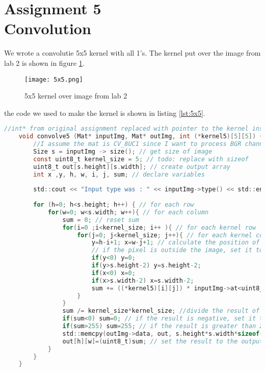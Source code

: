 \section {Assignment 5 \\ {Convolution}}
\label {sec:assignment_5}

We wrote a convolutie 5x5 kernel with all 1's. The kernel put over the image from lab 2 is shown in figure \ref{fig:5x5}.

\begin{figure}[h!]
    \centering
    \texttt{[image: 5x5.png]}
    \caption{5x5 kernel over image from lab 2}
    \label{fig:5x5}
\end{figure}

the code we used to make the kernel is shown in listing \ref{lst:5x5}.

\begin{lstlisting}[language=C, caption=5x5 kernel, label=lst:5x5]
    //int* from original assignment replaced with pointer to the kernel instead, because that makes more sense
    void convolve5 (Mat* inputImg, Mat* outImg, int (*kernel5)[5][5]) { 
        //I assume the mat is CV_8UC1 since I want to process BGR channels individually
        Size s = inputImg -> size(); // get size of image
        const uint8_t kernel_size = 5; // todo: replace with sizeof
        uint8_t out[s.height][s.width]; // create output array
        int x ,y, h, w, i, j, sum; // declare variables
        
        std::cout << "Input type was : " << inputImg->type() << std::endl; //debug
      
        for (h=0; h<s.height; h++) { // for each row
            for(w=0; w<s.width; w++){ // for each column
                sum = 0; // reset sum
                for(i=0 ;i<kernel_size; i++ ){ // for each kernel row
                    for(j=0; j<kernel_size; j++){ // for each kernel column
                        y=h-i+1; x=w-j+1; // calculate the position of the pixel in the image
                        // if the pixel is outside the image, set it to the border
                        if(y<0) y=0;
                        if(y>s.height-2) y=s.height-2; 
                        if(x<0) x=0;
                        if(x>s.width-2) x=s.width-2;
                        sum += ((*kernel5)[i][j]) * inputImg->at<uint8_t>(y,x); // add the product of the kernel and the pixel to the sum
                    }
                }
                sum /= kernel_size*kernel_size; //divide the result of the pixel by 5^2
                if(sum<0) sum=0; // if the result is negative, set it to 0
                if(sum>255) sum=255; // if the result is greater than 255, set it to 255
                std::memcpy(outImg->data, out, s.height*s.width*sizeof(uint8_t)); // copy the result to the output array
                out[h][w]=(uint8_t)sum; // set the result to the output array
            }
        }
    }
    
\end{lstlisting}